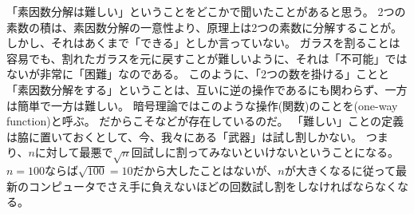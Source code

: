 「素因数分解は難しい」ということをどこかで聞いたことがあると思う。
2つの素数の積は、素因数分解の一意性より、原理上は2つの素数に分解することが。
しかし、それはあくまで「できる」としか言っていない。
ガラスを割ることは容易でも、割れたガラスを元に戻すことが難しいように、それは「不可能」ではないが非常に「困難」なのである。
このように、「2つの数を掛ける」ことと「素因数分解をする」ということは、互いに逆の操作であるにも関わらず、一方は簡単で一方は難しい。
暗号理論ではこのような操作(関数)のことを(one-way function)と呼ぶ。
だからこそなどが存在しているのだ。
「難しい」ことの定義は脇に置いておくとして、今、我々にある「武器」は試し割しかない。
つまり、$n$に対して最悪で$\sqrt{n}$回試しに割ってみないといけないということになる。
$n=100$ならば$\sqrt{100}=10$だから大したことはないが、$n$が大きくなるに従って最新のコンピュータでさえ手に負えないほどの回数試し割をしなければならなくなる。


